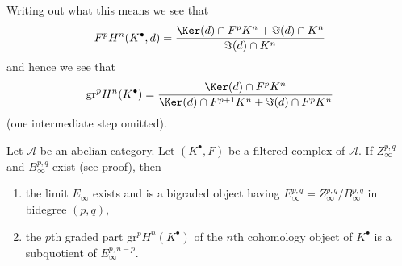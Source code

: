 \noindent
Writing out what this means we see that
\begin{equation}
\label{equation-filtration-cohomology}
F^pH^n(K^\bullet, d) =
\frac{\Ker(d) \cap F^pK^n + \Im(d) \cap K^n}{\Im(d) \cap K^n}
\end{equation}
and hence we see that
\begin{equation}
\label{equation-graded-cohomology}
\text{gr}^p H^n(K^\bullet) =
\frac{\Ker(d) \cap F^pK^n}{\Ker(d) \cap F^{p + 1}K^n + \Im(d) \cap F^pK^n}
\end{equation}
(one intermediate step omitted).

\begin{lemma}
\label{lemma-compute-cohomology-filtered-complex}
Let $\mathcal{A}$ be an abelian category. Let $(K^\bullet, F)$ be a filtered
complex of $\mathcal{A}$. If $Z_\infty^{p, q}$ and $B_\infty^{p, q}$ exist
(see proof), then
\begin{enumerate}
\item the limit $E_\infty$ exists and is a bigraded object having
$E_\infty^{p, q} = Z_\infty^{p, q}/B_\infty^{p, q}$ in bidegree $(p, q)$,
\item the $p$th graded part $\text{gr}^pH^n(K^\bullet)$ of the
$n$th cohomology object of $K^\bullet$ is a subquotient of
$E_\infty^{p, n - p}$.
\end{enumerate}
\end{lemma}

